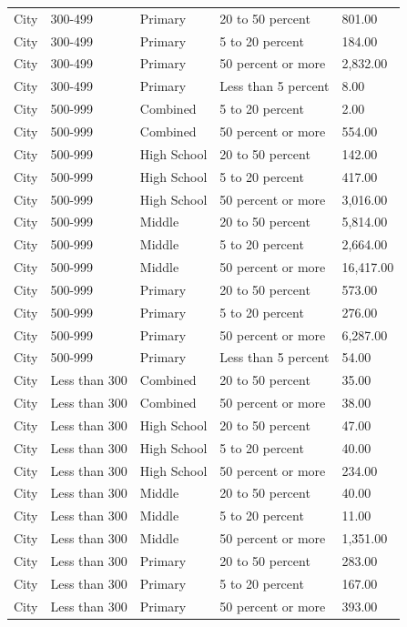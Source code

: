 \documentclass[
  man, fleqn, noextraspace]{apa6}
\begin{document}
\begin{table}[tbp]
\begin{center}
\begin{threeparttable}
\begin{tabular}{lllll}
City & 300-499 & Primary & 20 to 50 percent & 801.00\\
City & 300-499 & Primary & 5 to 20 percent & 184.00\\
City & 300-499 & Primary & 50 percent or more & 2,832.00\\
City & 300-499 & Primary & Less than 5 percent & 8.00\\
City & 500-999 & Combined & 5 to 20 percent & 2.00\\
City & 500-999 & Combined & 50 percent or more & 554.00\\
City & 500-999 & High School & 20 to 50 percent & 142.00\\
City & 500-999 & High School & 5 to 20 percent & 417.00\\
City & 500-999 & High School & 50 percent or more & 3,016.00\\
City & 500-999 & Middle & 20 to 50 percent & 5,814.00\\
City & 500-999 & Middle & 5 to 20 percent & 2,664.00\\
City & 500-999 & Middle & 50 percent or more & 16,417.00\\
City & 500-999 & Primary & 20 to 50 percent & 573.00\\
City & 500-999 & Primary & 5 to 20 percent & 276.00\\
City & 500-999 & Primary & 50 percent or more & 6,287.00\\
City & 500-999 & Primary & Less than 5 percent & 54.00\\
City & Less than 300 & Combined & 20 to 50 percent & 35.00\\
City & Less than 300 & Combined & 50 percent or more & 38.00\\
City & Less than 300 & High School & 20 to 50 percent & 47.00\\
City & Less than 300 & High School & 5 to 20 percent & 40.00\\
City & Less than 300 & High School & 50 percent or more & 234.00\\
City & Less than 300 & Middle & 20 to 50 percent & 40.00\\
City & Less than 300 & Middle & 5 to 20 percent & 11.00\\
City & Less than 300 & Middle & 50 percent or more & 1,351.00\\
City & Less than 300 & Primary & 20 to 50 percent & 283.00\\
City & Less than 300 & Primary & 5 to 20 percent & 167.00\\
City & Less than 300 & Primary & 50 percent or more & 393.00\\

\end{tabular}
\end{threeparttable}
\end{center}
\end{table}
\end{document}
